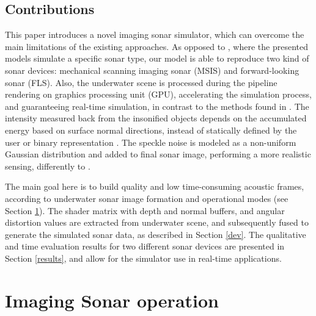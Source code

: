 \documentclass[final,5p,times]{elsarticle}
\begin{document}
\subsection{Contributions}

This paper introduces a novel imaging sonar simulator, which can overcome
the main limitations of the existing approaches. As opposed to \cite{bell1997,coiras2009,gueriot2010,sac2015,demarco2015,gu2013,kwak2015}, where
the presented models simulate a specific sonar type, our model is able to
reproduce two kind of sonar devices: mechanical scanning imaging sonar (MSIS) and forward-looking sonar (FLS). Also, the underwater scene is processed during the pipeline rendering on graphics processing unit (GPU), accelerating the simulation process, and guaranteeing  real-time simulation, in contrast to the methods found in \cite{bell1997,coiras2009,sac2015,demarco2015}. The intensity measured back from the insonified objects depends on the accumulated energy based on surface normal directions, instead of statically defined by the user \cite{demarco2015} or binary representation \cite{gu2013, kwak2015}. The speckle noise is modeled as a non-uniform Gaussian distribution and added to final sonar image, performing a more realistic sensing, differently to \cite{gueriot2010,sac2015,gu2013,kwak2015}.

The main goal here is to build quality and low time-consuming acoustic frames, according to underwater sonar image formation and operational modes (see Section \ref{sonar:operation}). The shader matrix with depth and normal buffers, and angular distortion values are extracted from underwater scene, and subsequently fused to generate the simulated sonar data, as described in Section \ref{dev}. The qualitative and time evaluation results for two different sonar devices are presented in Section \ref{results}, and allow for the simulator use in real-time applications.


\section{Imaging Sonar operation}
\label{sonar:operation}
\end{document}
